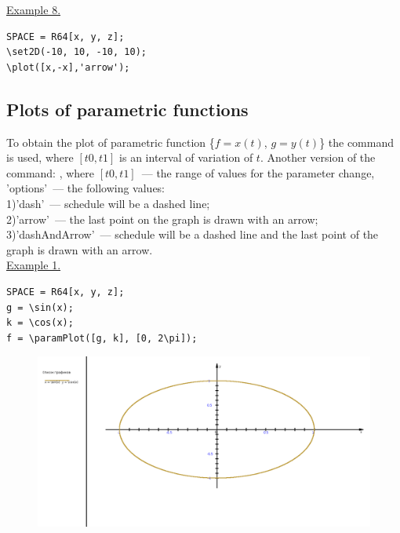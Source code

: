 \underline{Example 8. }
\vspace*{-2mm}
\begin{verbatim}
SPACE = R64[x, y, z]; 
\set2D(-10, 10, -10, 10);
\plot([x,-x],'arrow');
\end{verbatim}
\vspace*{-2mm}
 
\subsection{Plots of parametric functions}  
To obtain the plot of parametric function \{$f=x(t)$, $g=y(t)$\} the command 
 is used, where $[t0, t1]$ is an interval of variation of $t$.
Another version of the command:  , where $[t0, t1]$~--- the range of values for the parameter change, 
'options'~---  the following values:\\
1)'dash'~--- schedule will be a dashed line;\\ 
2)'arrow'~---  the last point on the graph is drawn with an arrow;\\
3)'dashAndArrow'~--- schedule will be a dashed line and the last point of the graph is drawn with an arrow.\\


\underline{Example 1. }


\nopagebreak
\vspace*{-2mm}
\begin{verbatim}
SPACE = R64[x, y, z];
g = \sin(x); 
k = \cos(x); 
f = \paramPlot([g, k], [0, 2\pi]);
\end{verbatim}
\vspace*{-2mm}

\begin{figure}[h!]
 \includegraphics[scale=0.26]{pictures/2_1}
\vspace*{-10mm}
\caption{}
\label{3_4}
\end{figure}


